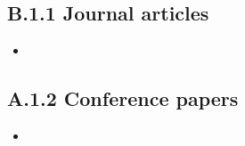\subsection*{B.1.1 Journal articles}
\begin{itemize}
\item {}
\end{itemize}

\subsection*{A.1.2 Conference papers}
\begin{itemize}
\item {}\end{itemize}

